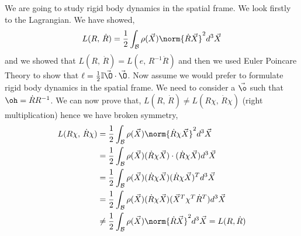 \noindent
We are going to study rigid body dynamics in the spatial frame. We look firstly to the Lagrangian. We have showed,
$$ L(R,\,\dot R) = \frac{1}{2} \int_\mathcal{B} \rho(\vec X) \norm{\dot R \vec X}^2 d^3\vec X $$
and we showed that $L(R,\, \dot R) = L(e,\, R^{-1}\dot R)$ and then we used Euler Poincare Theory to show that $\ell = \frac{1}{2}\mathbb{I}\vec\O \cdot \vec\O$. Now assume we would prefer to formulate rigid body dynamics in the spatial frame. We need to consider a $\vec\o$ such that $\oh = \dot R R^{-1}$. We can now prove that, $L(R,\,\dot R) \ne L(R\chi,\,\dot R\chi)$ (right multiplication) hence we have broken symmetry,
\begin{align*}
  L(R\chi,\,\dot R\chi) &= \frac{1}{2} \int_\mathcal{B} \rho(\vec X) \norm{\dot R \chi\vec X}^2 d^3\vec X \\
  &= \frac{1}{2} \int_\mathcal{B} \rho(\vec X) (\dot R \chi\vec X) \cdot (\dot R \chi\vec X) d^3\vec X \\
  &= \frac{1}{2} \int_\mathcal{B} \rho(\vec X) (\dot R \chi\vec X)  (\dot R \chi\vec X)^T d^3\vec X \\
  &= \frac{1}{2} \int_\mathcal{B} \rho(\vec X) (\dot R \chi\vec X)  (\vec X^T\chi^T\dot R^T) d^3\vec X \\
  &\ne \frac{1}{2} \int_\mathcal{B} \rho(\vec X) \norm{\dot R \vec X}^2 d^3\vec X = L(R, \dot R)
\end{align*}


